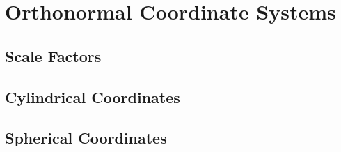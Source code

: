 \chapter{Orthonormal Coordinate Systems}
\section{Scale Factors}
\section{Cylindrical Coordinates}
\section{Spherical Coordinates}
